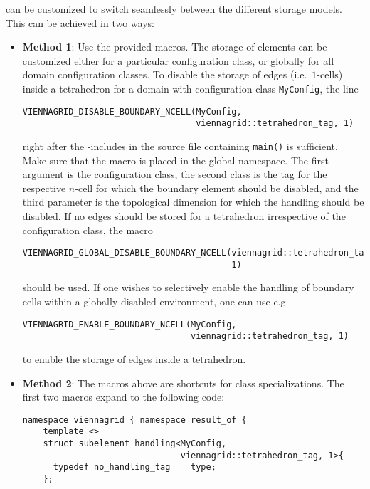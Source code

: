 
{\ViennaGrid} can be customized to switch seamlessly between the different storage models.
This can be achieved in two ways:
\begin{itemize}
 \item \textbf{Method 1}: Use the provided macros. The storage of elements can be customized either for a particular configuration class, or globally for all domain configuration classes. To disable the storage of edges (i.e.~$1$-cells) inside a tetrahedron for a domain with configuration class \lstinline|MyConfig|, the line
  \begin{lstlisting}
VIENNAGRID_DISABLE_BOUNDARY_NCELL(MyConfig,
                                  viennagrid::tetrahedron_tag, 1)
  \end{lstlisting}
right after the {\ViennaGrid}-includes in the source file containing \lstinline|main()| is sufficient. Make sure that the macro is placed in the global namespace. The first argument is the configuration class, the second class is the tag for the respective $n$-cell for which the boundary element should be disabled, and the third parameter is the topological dimension for which the handling should be disabled.
 If no edges should be stored for a tetrahedron irrespective of the configuration class, the macro
  \begin{lstlisting}
VIENNAGRID_GLOBAL_DISABLE_BOUNDARY_NCELL(viennagrid::tetrahedron_tag,
                                         1)
  \end{lstlisting}
 should be used. If one wishes to selectively enable the handling of boundary cells within a globally disabled environment, one can use e.g.
  \begin{lstlisting}
VIENNAGRID_ENABLE_BOUNDARY_NCELL(MyConfig,
                                 viennagrid::tetrahedron_tag, 1)
  \end{lstlisting}
 to enable the storage of edges inside a tetrahedron.

 \item \textbf{Method 2}: The macros above are shortcuts for class specializations. The first two macros expand to the following code:
\begin{lstlisting}
namespace viennagrid { namespace result_of {
    template <>
    struct subelement_handling<MyConfig,
                               viennagrid::tetrahedron_tag, 1>{
      typedef no_handling_tag    type;
    };


\end{lstlisting}
\end{itemize}

